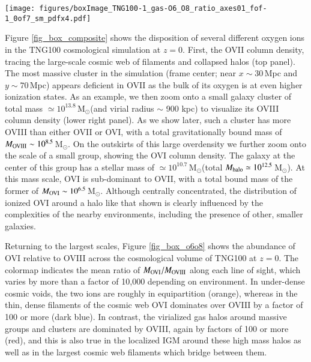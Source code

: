 \documentclass[useAMS,usenatbib]{mnras}
\newcommand{\msun}{\,M$_{\odot}$\xspace}
\newcommand{\ovi}{OVI\xspace}
\newcommand{\ovii}{OVII\xspace}
\newcommand{\oviii}{OVIII\xspace}
\begin{document}
\begin{figure*}
\centering
\texttt{[image: figures/boxImage\_TNG100-1\_gas-O6\_O8\_ratio\_axes01\_fof-1\_0of7\_sm\_pdfx4.pdf]}
\caption{ The relationship between highly ionized \ovi and \oviii across the TNG100 cosmological simulation at $z=0$. We show a slice 15 Mpc deep along the line of sight direction, where the color indicates the average ratio of the mass present in the \ovi versus \oviii ions of oxygen. Thin, small-scale cosmic filaments are dominated by \ovi by a factor of 100 or more (blue), whereas the virialized gas in massive collapsed halos, as well as in large cosmic filaments between clusters and the near-field IGM around clusters are dominated by \oviii, also by a factor of 100 or more (red). Regions of the volume near unity (orange) show where these two ions are equally abundant -- in low-density, low-metallicity cosmic voids. The 50 most massive visible halos are shown as white circles at their virial radii.
 \label{fig_box_o6o8}}
\end{figure*}

Figure \ref{fig_box_composite} shows the disposition of several different oxygen ions in the TNG100 cosmological simulation at $z=0$. First, the \ovii column density, tracing the large-scale cosmic web of filaments and collapsed halos (top panel). The most massive cluster in the simulation (frame center; near $x \sim 30$\,Mpc and $y \sim 70$\,Mpc) appears deficient in \ovii as the bulk of its oxygen is at even higher ionization states. As an example, we then zoom onto a small galaxy cluster of total mass $\simeq 10^{13.8}$\msun (and virial radius $\sim$ 900 kpc) to visualize its \oviii column density (lower right panel). As we show later, such a cluster has more \oviii than either \ovii or \ovi, with a total gravitationally bound mass of $M_{\rm OVIII} \sim 10^{8.5}$\msun. On the outskirts of this large overdensity we  further zoom onto the scale of a small group, showing the \ovi column density. The galaxy at the center of this group has a stellar mass of $\simeq 10^{10.7}$\msun (total $M_{\rm halo} \simeq 10^{12.5}$\msun). At this mass scale, \ovi is sub-dominant to \ovii, with a total bound mass of the former of $M_{\rm OVI} \sim 10^{6.5}$\msun. Although centrally concentrated, the distribution of ionized \ovi around a halo like that shown is clearly influenced by the complexities of the nearby environments, including the presence of other, smaller galaxies.

Returning to the largest scales, Figure \ref{fig_box_o6o8} shows the abundance of \ovi relative to \oviii across the cosmological volume of TNG100 at $z=0$. The colormap indicates the mean ratio of $M_{\rm OVI} / M_{\rm OVIII}$ along each line of sight, which varies by more than a factor of 10,000 depending on environment. In under-dense cosmic voids, the two ions are roughly in equipartition (orange), whereas in the thin, dense filaments of the cosmic web \ovi dominates over \oviii by a factor of 100 or more (dark blue). In contrast, the virialized gas halos around massive groups and clusters are dominated by \oviii, again by factors of 100 or more (red), and this is also true in the localized IGM around these high mass halos as well as in the largest cosmic web filaments which bridge between them.
\end{document}
